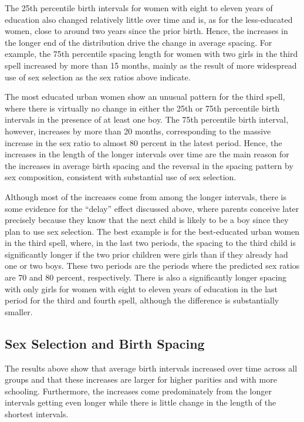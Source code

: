 \documentclass[12pt,letterpaper]{article}
\begin{document}
The 25th percentile birth intervals for women with eight to eleven years of education also 
changed relatively little over time and is, as for the less-educated women, close to
around two years since the prior birth.
Hence, the increases in the longer end of the distribution drive
the change in average spacing.
For example, the 75th percentile spacing length for women with two girls in the third 
spell increased by more than 15 months, mainly as the result of more widespread use of sex 
selection as the sex ratios above indicate.
 
The most educated urban women show an unusual pattern for the third spell, where there 
is virtually no change in either the 25th or 75th percentile birth intervals in the
presence of at least one boy.
The 75th percentile birth interval, however, increases by more than 20 months,
corresponding to the massive increase in the sex ratio to almost 80 percent in the 
latest period.
Hence, the increases in the length of the longer intervals over time are
the main reason for the increases in average birth spacing and the
reversal in the spacing pattern by sex composition, consistent with
substantial use of sex selection.

Although most of the increases come from among the longer intervals, there is some 
evidence for the ``delay'' effect discussed above, where parents conceive later
precisely because they know that the next child is likely to be a boy since they plan
to use sex selection.
The best example is for the best-educated urban women in the third spell, where, in the 
last two periods, the spacing to the third child is significantly longer if the two prior 
children were girls than if they already had one or two boys.
These two periods are the periods where the predicted sex ratios are 70 and 80 percent,
respectively.
There is also a significantly longer spacing with only girls for women with eight to
eleven years of education in the last period for the third and fourth spell, although
the difference is substantially smaller.

\subsection{Sex Selection and Birth Spacing}

The results above show that average birth intervals increased over time across all groups 
and that these increases are larger for higher parities and with more schooling. 
Furthermore, the increases come predominately from the longer intervals getting even 
longer while there is little change in the length of the shortest intervals.
\end{document}
